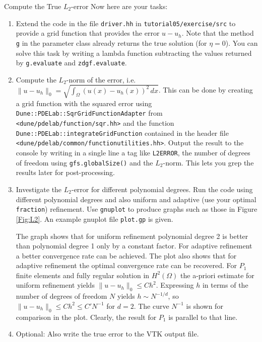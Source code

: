 \documentclass[12pt,a4paper]{article}
\begin{document}
\begin{Exercise}{Compute the True $L_2$-error}
Now here are your tasks:
\begin{enumerate}
\item Extend the code in the file \lstinline{driver.hh} in \lstinline{tutorial05/exercise/src}
to provide a grid function that provides the error $u-u_h$. Note that the method \lstinline{g}
in the parameter class already returns the true solution (for $\eta=0$).
You can solve this task by writing a lambda function subtracting the values returned
by \lstinline{g.evaluate} and \lstinline{zdgf.evaluate}.
\item Compute the $L_2$-norm of the error, i.e. $\|u-u_h\|_0 = \sqrt{\int_\Omega
(u(x)-u_h(x))^2\,dx}$. This can be done by creating a grid function
with the squared error using \lstinline{Dune::PDELab::SqrGridFunctionAdapter}
from \lstinline{<dune/pdelab/function/sqr.hh>} and the function
\lstinline{Dune::PDELab::integrateGridFunction} contained in the header file
\lstinline{<dune/pdelab/common/functionutilities.hh>}.
Output the result to the console by writing in a single line a tag
like \lstinline{L2ERROR}, the number of degrees of freedom
using \lstinline{gfs.globalSize()} and the $L_2$-norm. This
lets you grep the results later for post-processing.
\item Investigate the $L_2$-error for different polynomial degrees. Run the code
using different polynomial degrees and also uniform and adaptive (use your optimal
\lstinline{fraction}) refinement. Use \lstinline{gnuplot} to produce graphs such as
those in Figure \ref{Fig:L2}. An example gnuplot file \lstinline{plot.gp} is given.

The graph shows that for uniform refinement polynomial degree 2 is better than
polynomial degree 1 only by a constant factor. For adaptive refinement a better
convergence rate can be achieved. The plot also shows that for adaptive refinement
the optimal convergence rate can be recovered. For $P_1$ finite elements and fully regular
solution in $H^2(\Omega)$ the a-priori estimate for uniform refinement yields
$\|u-u_h\|_0\leq C h^2$. Expressing $h$ in terms of the number of degrees of freedom
$N$ yields $h\sim N^{-1/d}$, so $\|u-u_h\|_0\leq C h^2 \leq C' N^{-1}$ for $d=2$.
The curve $N^{-1}$ is shown for comparison in the plot. Clearly, the result for $P_1$ is parallel
to that line.
\item Optional: Also write the true error to the VTK output file.
\end{enumerate}

\end{Exercise}
\end{document}
